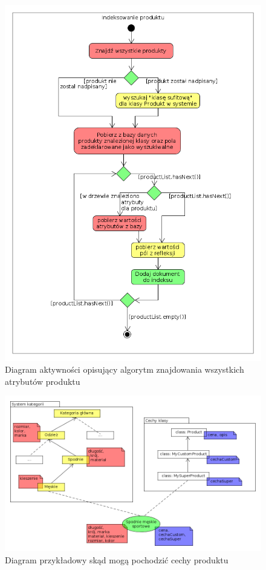 \begin{figure}
	\begin{center}
		\includegraphics[scale=0.5]{diagramaktywIndeks.png}
	\end{center}
	\caption{{\color{black}Diagram aktywności opisujący algorytm znajdowania wszystkich atrybutów produktu}} \label{diagramaktywIndeks}
\end{figure}
\begin{figure}
	\begin{center}
		\includegraphics[scale=0.5]{cechyProd.png}
	\end{center}
	\caption{{\color{black}Diagram przykładowy skąd mogą pochodzić cechy produktu}} \label{cechyProd}
\end{figure}

